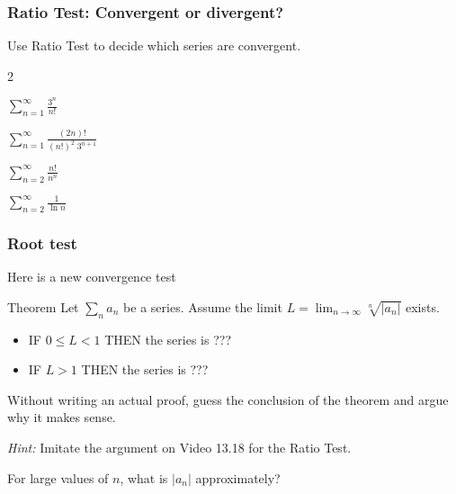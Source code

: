 \documentclass[14pt]{beamer}
\begin{document}
	\begin{frame}[t]
		\frametitle{Ratio Test: Convergent or divergent?}

		Use Ratio Test to decide which series are convergent.

		\begin{enumerate}
		\end{enumerate}
	\end{frame}

	\begin{frame}[t]
		\fontsize{13}{13}\selectfont
		\frametitle{Root test}

		Here is a new convergence test
		\begin{block}{Theorem}
			Let $\displaystyle \sum_{n}a_{n}$ be a series. Assume the limit
			$\displaystyle L= \lim_{n \to \infty}\sqrt[n]{|a_{n}|}$ exists.
			\begin{itemize}
				\item IF $0 \leq L <1$ THEN the series is ???

				\item IF $L > 1$ THEN the series is ???
			\end{itemize}
		\end{block}

		Without writing an actual proof, guess the conclusion of the theorem and argue
		why it makes sense.

		\emph{Hint:} Imitate the argument on Video 13.18 for the Ratio Test.

		For large values of $n$, what is $|a_{n}|$ approximately?
	\end{frame}

\end{document}
